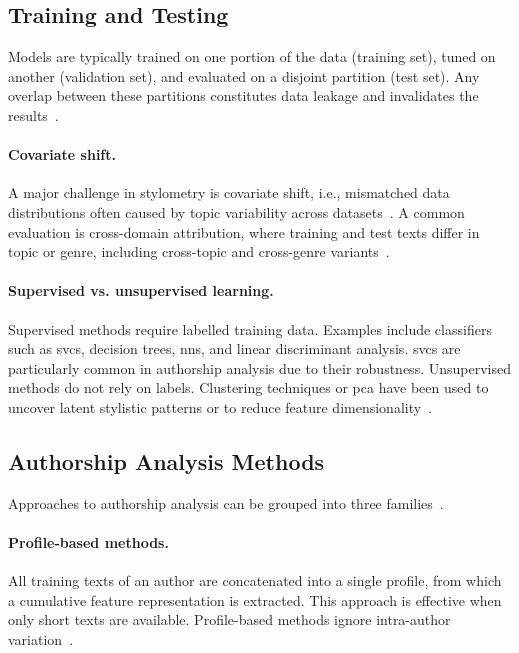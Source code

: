 \subsection{Training and Testing}

Models are typically trained on one portion of the data (training set), tuned on another (validation set), and evaluated on a disjoint partition (test set). 
Any overlap between these partitions constitutes data leakage and invalidates the results~\citep{bischoff_importance_2020,altakrori_topic_2021,boenninghoff_o2d2_2021}. 

\paragraph{Covariate shift.}
A major challenge in stylometry is covariate shift, i.e., mismatched data distributions often caused by topic variability across datasets~\citep{boenninghoff_o2d2_2021}. A common evaluation is cross-domain attribution, where training and test texts differ in topic or genre, including cross-topic and cross-genre variants~\citep{barlas_cross_domain_2020}.

\paragraph{Supervised vs. unsupervised learning.}  
Supervised methods require labelled training data. 
Examples include classifiers such as \acp{svc}, decision trees, \acp{nn}, and linear discriminant analysis. 
\acp{svc} are particularly common in authorship analysis due to their robustness. 
Unsupervised methods do not rely on labels.
Clustering techniques or \acl{pca} have been used to uncover latent stylistic patterns or to reduce feature dimensionality~\citep{abbasi_writeprints_2008}.


\subsection{Authorship Analysis Methods}
\label{subsec:attribution_methods}

Approaches to authorship analysis can be grouped into three families~\citep{stamatatos_survey_2009}.

\paragraph{Profile-based methods.} 
All training texts of an author are concatenated into a single profile, from which a cumulative feature representation is extracted. 
This approach is effective when only short texts are available.
Profile-based methods ignore intra-author variation~\citep{stamatatos_survey_2009,elmanarelbouanani_authorship_2014,neal_surveying_2018}.  

